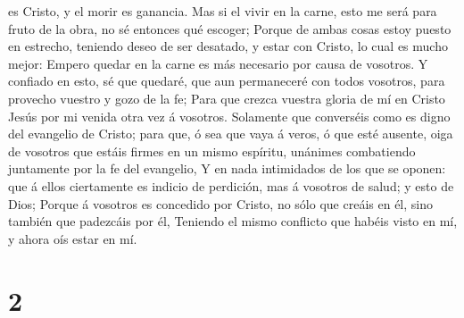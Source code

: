 es Cristo, y el morir es ganancia.  Mas si el vivir en la
carne, esto me será para fruto de la obra, no sé entonces qué escoger;
 Porque de ambas cosas estoy puesto en estrecho, teniendo
deseo de ser desatado, y estar con Cristo, lo cual es mucho mejor:
 Empero quedar en la carne es más necesario por causa de
vosotros.  Y confiado en esto, sé que quedaré, que aun
permaneceré con todos vosotros, para provecho vuestro y gozo de la fe;
 Para que crezca vuestra gloria de mí en Cristo Jesús por
mi venida otra vez á vosotros.  Solamente que converséis
como es digno del evangelio de Cristo; para que, ó sea que vaya á veros,
ó que esté ausente, oiga de vosotros que estáis firmes en un mismo
espíritu, unánimes combatiendo juntamente por la fe del evangelio,
 Y en nada intimidados de los que se oponen: que á ellos
ciertamente es indicio de perdición, mas á vosotros de salud; y esto de
Dios;  Porque á vosotros es concedido por Cristo, no sólo
que creáis en él, sino también que padezcáis por él, 
Teniendo el mismo conflicto que habéis visto en mí, y ahora oís estar en
mí.

\hypertarget{section-1}{%
\section{2}\label{section-1}}

